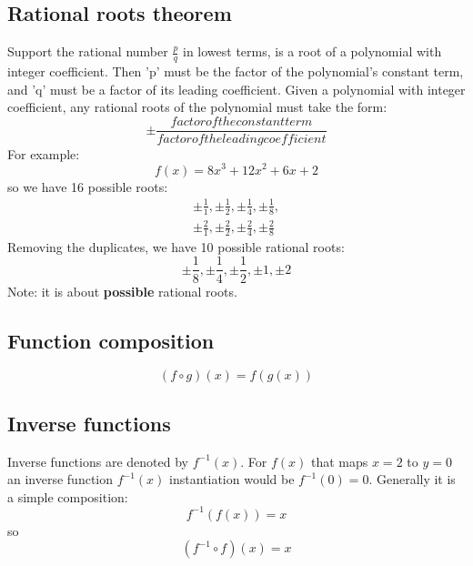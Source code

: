 \documentclass{article}
\begin{document}
\subsection{Rational roots theorem}
Support the rational number $\frac{p}{q}$ in lowest terms, is a root of a polynomial
with integer coefficient.
Then 'p' must be the factor of the polynomial's constant term, and 'q' must be a factor
of its leading coefficient.
Given a polynomial with integer coefficient, any rational roots of the polynomial must take the
form:
\begin{equation}
  \pm \frac{factor  of  the  constant  term}{factor  of  the  leading  coefficient}
\end{equation}
For example:
\begin{equation}
  f(x) = 8x^3 + 12x^2 + 6x + 2
\end{equation}
so we have 16 possible roots:
\begin{equation}
  \begin{gathered}
    \pm \frac{1}{1}, \pm \frac{1}{2}, \pm \frac{1}{4}, \pm \frac{1}{8}, \\
    \pm \frac{2}{1}, \pm \frac{2}{2}, \pm \frac{2}{4}, \pm \frac{2}{8}
  \end{gathered}
\end{equation}
Removing the duplicates, we have 10 possible rational roots:
\begin{equation}
  \pm \frac{1}{8}, \pm \frac{1}{4}, \pm \frac{1}{2}, \pm 1, \pm 2
\end{equation}
Note: it is about \textbf{possible} rational roots.

\subsection{Function composition}
\begin{equation}
  (f \circ g)(x) = f(g(x))
\end{equation}
\subsection{Inverse functions}
Inverse functions are denoted by $f^{-1}(x)$.
For $f(x)$ that maps $x=2$ to $y=0$ an inverse function $f^{-1}(x)$ instantiation would be
$f^{-1}(0)=0$.
Generally it is a simple composition:
\begin{equation}
  f^{-1}(f(x)) = x
\end{equation}
so
\begin{equation}
  (f^{-1} \circ f)(x) = x
\end{equation}
\end{document}
